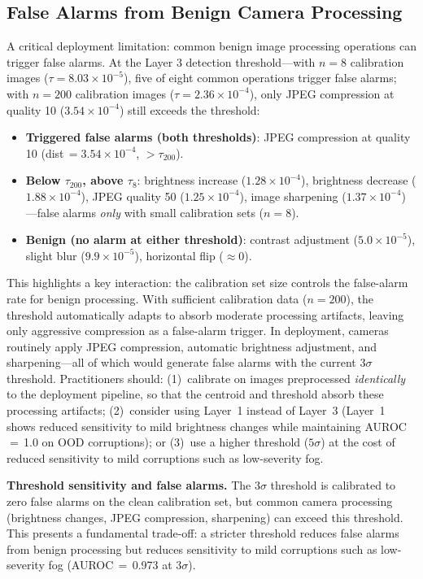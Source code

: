 \documentclass[11pt]{article}
\begin{document}
\subsection{False Alarms from Benign Camera Processing}
\label{sec:false_alarms}

A critical deployment limitation: common benign image processing operations can trigger false alarms.
At the Layer 3 detection threshold---with $n{=}8$ calibration images ($\tau = 8.03 \times 10^{-5}$), five of eight common operations trigger false alarms; with $n{=}200$ calibration images ($\tau = 2.36 \times 10^{-4}$), only JPEG compression at quality 10 ($3.54 \times 10^{-4}$) still exceeds the threshold:

\begin{itemize}
    \item \textbf{Triggered false alarms (both thresholds)}: JPEG compression at quality 10 (dist\,$= 3.54 \times 10^{-4}$, $> \tau_{200}$).
    \item \textbf{Below $\tau_{200}$, above $\tau_8$}: brightness increase ($1.28 \times 10^{-4}$), brightness decrease ($1.88 \times 10^{-4}$), JPEG quality 50 ($1.25 \times 10^{-4}$), image sharpening ($1.37 \times 10^{-4}$)---false alarms \emph{only} with small calibration sets ($n{=}8$).
    \item \textbf{Benign (no alarm at either threshold)}: contrast adjustment ($5.0 \times 10^{-5}$), slight blur ($9.9 \times 10^{-5}$), horizontal flip ($\approx 0$).
\end{itemize}

This highlights a key interaction: the calibration set size controls the false-alarm rate for benign processing. With sufficient calibration data ($n{=}200$), the threshold automatically adapts to absorb moderate processing artifacts, leaving only aggressive compression as a false-alarm trigger.
In deployment, cameras routinely apply JPEG compression, automatic brightness adjustment, and sharpening---all of which would generate false alarms with the current $3\sigma$ threshold.
Practitioners should: (1)~calibrate on images preprocessed \emph{identically} to the deployment pipeline, so that the centroid and threshold absorb these processing artifacts; (2)~consider using Layer~1 instead of Layer~3 (Layer~1 shows reduced sensitivity to mild brightness changes while maintaining AUROC\,$=$\,1.0 on OOD corruptions); or (3)~use a higher threshold ($5\sigma$) at the cost of reduced sensitivity to mild corruptions such as low-severity fog.

\textbf{Threshold sensitivity and false alarms.}
The $3\sigma$ threshold is calibrated to zero false alarms on the clean calibration set, but common camera processing (brightness changes, JPEG compression, sharpening) can exceed this threshold.
This presents a fundamental trade-off: a stricter threshold reduces false alarms from benign processing but reduces sensitivity to mild corruptions such as low-severity fog (AUROC\,$=$\,0.973 at $3\sigma$).
\end{document}

